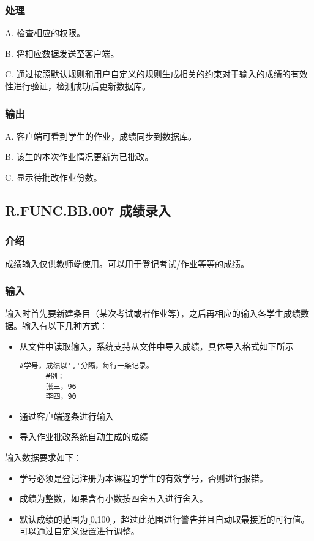 \subsubsection{处理}
A. 检查相应的权限。

B. 将相应数据发送至客户端。

C. 通过按照默认规则和用户自定义的规则生成相关的约束对于输入的成绩的有效性进行验证，检测成功后更新数据库。

\subsubsection{输出}
A. 客户端可看到学生的作业，成绩同步到数据库。

B. 该生的本次作业情况更新为已批改。

C. 显示待批改作业份数。

  \subsection{R.FUNC.BB.007 成绩录入}
    \subsubsection{介绍}
    成绩输入仅供教师端使用。可以用于登记考试/作业等等的成绩。
    \subsubsection{输入}
    输入时首先要新建条目（某次考试或者作业等），之后再相应的输入各学生成绩数据。输入有以下几种方式：
    \begin{itemize}
      \item 从文件中读取输入，系统支持从文件中导入成绩，具体导入格式如下所示
      \begin{lstlisting}[caption=文件导入成绩示例, label={code:import_grade_from_file}]
      #学号，成绩以','分隔，每行一条记录。
      #例：
      张三，96
      李四，90
      \end{lstlisting}
      \item 通过客户端逐条进行输入
      \item 导入作业批改系统自动生成的成绩
    \end{itemize}
    输入数据要求如下：
    \begin{itemize}
      \item 学号必须是登记注册为本课程的学生的有效学号，否则进行报错。
      \item 成绩为整数，如果含有小数按四舍五入进行舍入。
      \item 默认成绩的范围为[0,100]，超过此范围进行警告并且自动取最接近的可行值。可以通过自定义设置进行调整。
    \end{itemize}

